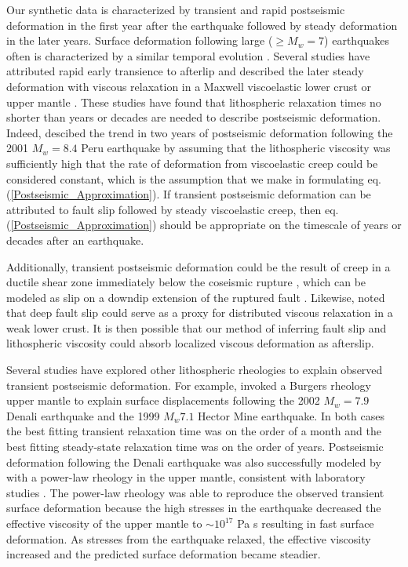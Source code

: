 \documentclass[extra]{gji}
\begin{document}
Our synthetic data is characterized by transient and rapid postseismic
deformation in the first year after the earthquake followed by steady
deformation in the later years.  Surface deformation following large
($\geq M_w=7$) earthquakes often is characterized by a similar
temporal evolution \citep[e.g.][]{SS1997,S2005,E2009}.  Several
studies have attributed rapid early transience to afterlip and
described the later steady deformation with viscous relaxation in a
Maxwell viscoelastic lower crust or upper mantle
\citep[e.g.][]{PA2005,J2009,H2009,F2006,R2015}.  These studies have
found that lithospheric relaxation times no shorter than years or
decades are needed to describe postseismic deformation.  Indeed,
\citet{PA2005} descibed the trend in two years of postseismic
deformation following the 2001 $M_w=8.4$ Peru earthquake by assuming
that the lithospheric viscosity was sufficiently high that the rate of
deformation from viscoelastic creep could be considered constant,
which is the assumption that we make in formulating
eq. (\ref{Postseismic_Approximation}). If transient postseismic
deformation can be attributed to fault slip followed by steady
viscoelastic creep, then eq. (\ref{Postseismic_Approximation}) should
be appropriate on the timescale of years or decades after an
earthquake.

Additionally, transient postseismic deformation could be the result of
creep in a ductile shear zone immediately below the coseismic rupture
\citep[e.g.][]{HZ2014}, which can be modeled as slip on a downdip
extension of the ruptured fault \citep[e.g.][]{H2002,KS2003,JS2004}.
Likewise, \citet{F2006} noted that deep fault slip could serve as a
proxy for distributed viscous relaxation in a weak lower crust.  It is
then possible that our method of inferring fault slip and lithospheric
viscosity could absorb localized viscous deformation as afterslip.

Several studies have explored other lithospheric rheologies to explain
observed transient postseismic deformation.  For example,
\citet{P2003,P2005} invoked a Burgers rheology upper mantle to explain
surface displacements following the 2002 $M_w=7.9$ Denali earthquake
and the 1999 $M_w7.1$ Hector Mine earthquake.  In both cases the best
fitting transient relaxation time was on the order of a month and the
best fitting steady-state relaxation time was on the order of years.
Postseismic deformation following the Denali earthquake was also
successfully modeled by \citet{F2006b} with a power-law rheology in
the upper mantle, consistent with laboratory studies
\citep[e.g.][]{KK1987}.  The power-law rheology was able to reproduce
the observed transient surface deformation because the high stresses
in the earthquake decreased the effective viscosity of the upper
mantle to $\sim10^{17}$ Pa s resulting in fast surface deformation.  As
stresses from the earthquake relaxed, the effective viscosity
increased and the predicted surface deformation became steadier.
\end{document}
